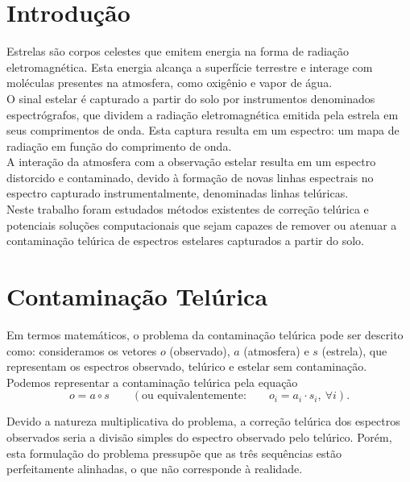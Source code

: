 \documentclass[a1]{sciposter}
\begin{document}
\begin{multicols}{2}

\section{Introdução}

Estrelas são corpos celestes que emitem energia na forma de radiação eletromagnética. Esta energia alcança a superfície terrestre e interage com moléculas presentes na atmosfera, como oxigênio e vapor de água.\\

O sinal estelar é capturado a partir do solo por instrumentos denominados espectrógrafos, que dividem a radiação eletromagnética emitida pela estrela em seus comprimentos de onda. Esta captura resulta em um espectro: um mapa de radiação em função do comprimento de onda.\\

A interação da atmosfera com a observação estelar resulta em um espectro distorcido e contaminado, devido à formação de novas linhas espectrais no espectro capturado instrumentalmente, denominadas linhas telúricas.\\

Neste trabalho foram estudados métodos existentes de correção telúrica e potenciais soluções computacionais que sejam capazes de remover ou atenuar a contaminação telúrica de espectros estelares capturados a partir do solo.

\section{Contaminação Telúrica}

Em termos matemáticos, o problema da contaminação telúrica pode ser descrito como: consideramos os vetores $o$ (observado), $a$ (atmosfera) e $s$ (estrela), que representam os espectros observado, telúrico e estelar sem contaminação. Podemos representar a contaminação telúrica pela equação
\begin{equation*}
    o = a \circ s \qquad \left(\mbox{ou equivalentemente:} \qquad o_i = a_i\cdot s_i,\ \forall i\right).
\end{equation*}

Devido a natureza multiplicativa do problema, a correção telúrica dos espectros observados seria a divisão simples do espectro observado pelo telúrico. Porém, esta formulação do problema pressupõe que as três sequências estão perfeitamente alinhadas, o que não corresponde à realidade.


\end{multicols}
\end{document}
